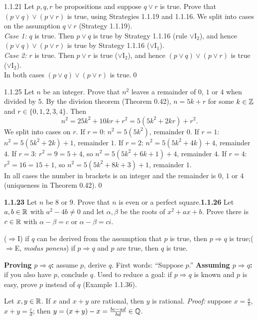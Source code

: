 \begin{bookex}[essential]{1.1.21}
Let $p,q,r$ be propositions and suppose $q\vee r$ is true. Prove that $(p\vee q)\vee(p\vee r)$ is true, using Strategies 1.1.19 and 1.1.16.
\solution
We split into cases on the assumption $q\vee r$ (Strategy 1.1.19).\\
\emph{Case 1:} $q$ is true. Then $p\vee q$ is true by Strategy 1.1.16 (rule $\vee$I$_2$), and hence $(p\vee q)\vee(p\vee r)$ is true by Strategy 1.1.16 ($\vee$I$_1$).\\
\emph{Case 2:} $r$ is true. Then $p\vee r$ is true ($\vee$I$_2$), and hence $(p\vee q)\vee(p\vee r)$ is true ($\vee$I$_2$).\\
In both cases $(p\vee q)\vee(p\vee r)$ is true.\qed
\end{bookex}

\begin{bookex}[essential]{1.1.25}
Let $n$ be an integer. Prove that $n^2$ leaves a remainder of $0$, $1$ or $4$ when divided by $5$.
\solution
By the division theorem (Theorem 0.42), $n=5k+r$ for some $k\in\mathbb{Z}$ and $r\in\{0,1,2,3,4\}$. Then
\[
n^2=25k^2+10kr+r^2=5(5k^2+2kr)+r^2 .
\]
We split into cases on $r$. If $r=0$: $n^2=5(5k^2)$, remainder $0$. If $r=1$: $n^2=5(5k^2+2k)+1$, remainder $1$. If $r=2$: $n^2=5(5k^2+4k)+4$, remainder $4$. If $r=3$: $r^2=9=5+4$, so $n^2=5(5k^2+6k+1)+4$, remainder $4$. If $r=4$: $r^2=16=15+1$, so $n^2=5(5k^2+8k+3)+1$, remainder $1$.\\
In all cases the number in brackets is an integer and the remainder is $0$, $1$ or $4$ (uniqueness in Theorem 0.42).\qed
\end{bookex}

\begin{trybox}[{1.1.23, 1.1.26 \fO}]
\textbf{1.1.23} Let $n$ be $8$ or $9$. Prove that $n$ is even or a perfect square.\quad \textbf{1.1.26} Let $a,b\in\mathbb{R}$ with $a^2-4b\ne0$ and let $\alpha,\beta$ be the roots of $x^2+ax+b$. Prove there is $c\in\mathbb{R}$ with $\alpha-\beta=c$ or $\alpha-\beta=ci$.
\end{trybox}

\begin{key}
($\Rightarrow$I) if $q$ can be derived from the assumption that $p$ is true, then $p\Rightarrow q$ is true;\quad ($\Rightarrow$E, \emph{modus ponens}) if $p\Rightarrow q$ and $p$ are true, then $q$ is true.
\end{key}
\begin{strategy}
\textbf{Proving $p\Rightarrow q$:} assume $p$, derive $q$. First words: ``Suppose $p$.'' \textbf{Assuming $p\Rightarrow q$:} if you also have $p$, conclude $q$. Used to reduce a goal: if $p\Rightarrow q$ is known and $p$ is easy, prove $p$ instead of $q$ (Example 1.1.36).
\end{strategy}
\begin{result}[{Proposition 1.1.30}]
Let $x,y\in\mathbb{R}$. If $x$ and $x+y$ are rational, then $y$ is rational. \emph{Proof:} suppose $x=\frac ab$, $x+y=\frac cd$; then $y=(x+y)-x=\frac{bc-ad}{bd}\in\mathbb{Q}$.
\end{result}

